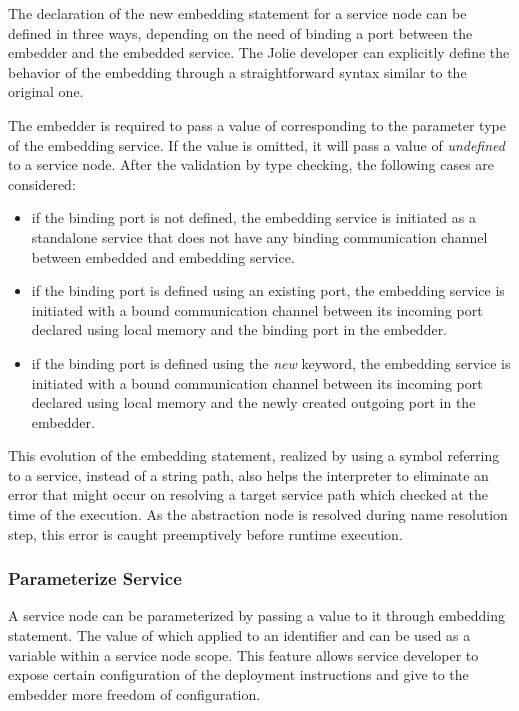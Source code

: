 The declaration of the new embedding statement for a service node can be defined in three ways, depending on the need of binding a port between the embedder and the embedded service. The Jolie developer can explicitly define the behavior of the embedding through a straightforward syntax similar to the original one.

The embedder is required to pass a value of corresponding to the parameter type of the embedding service. If the value is omitted, it will pass a value of \textit{undefined} to a service node. After the validation by type checking, the following cases are considered:

\begin{itemize}
    \item if the binding port is not defined, the embedding service is initiated as a standalone service that does not have any binding communication channel between embedded and embedding service.
    \item if the binding port is defined using an existing port, the embedding service is initiated with a bound communication channel between its incoming port declared using local memory and the binding port in the embedder.
    \item if the binding port is defined using the \textit{new} keyword, the embedding service is initiated with a bound communication channel between its incoming port declared using local memory and the newly created outgoing port in the embedder.
\end{itemize}

This evolution of the embedding statement, realized by using a symbol referring to a service, instead of a string path, also helps the interpreter to eliminate an error that might occur on resolving a target service path which checked at the time of the execution. As the abstraction node is resolved during name resolution step, this error is caught preemptively before runtime execution.

\subsubsection{Parameterize Service}

A service node can be parameterized by passing a value to it through embedding statement. The value of which applied to an identifier and can be used as a variable within a service node scope. This feature allows service developer to expose certain configuration of the deployment instructions and give to the embedder more freedom of configuration.

